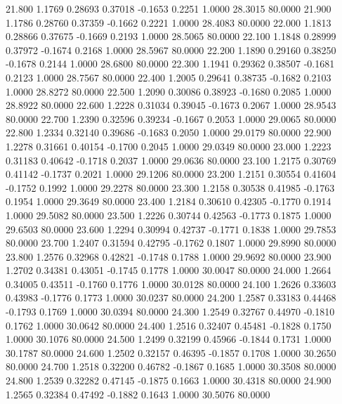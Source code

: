  21.800   1.1769   0.28693   0.37018  -0.1653   0.2251   1.0000  28.3015  80.0000
  21.900   1.1786   0.28760   0.37359  -0.1662   0.2221   1.0000  28.4083  80.0000
  22.000   1.1813   0.28866   0.37675  -0.1669   0.2193   1.0000  28.5065  80.0000
  22.100   1.1848   0.28999   0.37972  -0.1674   0.2168   1.0000  28.5967  80.0000
  22.200   1.1890   0.29160   0.38250  -0.1678   0.2144   1.0000  28.6800  80.0000
  22.300   1.1941   0.29362   0.38507  -0.1681   0.2123   1.0000  28.7567  80.0000
  22.400   1.2005   0.29641   0.38735  -0.1682   0.2103   1.0000  28.8272  80.0000
  22.500   1.2090   0.30086   0.38923  -0.1680   0.2085   1.0000  28.8922  80.0000
  22.600   1.2228   0.31034   0.39045  -0.1673   0.2067   1.0000  28.9543  80.0000
  22.700   1.2390   0.32596   0.39234  -0.1667   0.2053   1.0000  29.0065  80.0000
  22.800   1.2334   0.32140   0.39686  -0.1683   0.2050   1.0000  29.0179  80.0000
  22.900   1.2278   0.31661   0.40154  -0.1700   0.2045   1.0000  29.0349  80.0000
  23.000   1.2223   0.31183   0.40642  -0.1718   0.2037   1.0000  29.0636  80.0000
  23.100   1.2175   0.30769   0.41142  -0.1737   0.2021   1.0000  29.1206  80.0000
  23.200   1.2151   0.30554   0.41604  -0.1752   0.1992   1.0000  29.2278  80.0000
  23.300   1.2158   0.30538   0.41985  -0.1763   0.1954   1.0000  29.3649  80.0000
  23.400   1.2184   0.30610   0.42305  -0.1770   0.1914   1.0000  29.5082  80.0000
  23.500   1.2226   0.30744   0.42563  -0.1773   0.1875   1.0000  29.6503  80.0000
  23.600   1.2294   0.30994   0.42737  -0.1771   0.1838   1.0000  29.7853  80.0000
  23.700   1.2407   0.31594   0.42795  -0.1762   0.1807   1.0000  29.8990  80.0000
  23.800   1.2576   0.32968   0.42821  -0.1748   0.1788   1.0000  29.9692  80.0000
  23.900   1.2702   0.34381   0.43051  -0.1745   0.1778   1.0000  30.0047  80.0000
  24.000   1.2664   0.34005   0.43511  -0.1760   0.1776   1.0000  30.0128  80.0000
  24.100   1.2626   0.33603   0.43983  -0.1776   0.1773   1.0000  30.0237  80.0000
  24.200   1.2587   0.33183   0.44468  -0.1793   0.1769   1.0000  30.0394  80.0000
  24.300   1.2549   0.32767   0.44970  -0.1810   0.1762   1.0000  30.0642  80.0000
  24.400   1.2516   0.32407   0.45481  -0.1828   0.1750   1.0000  30.1076  80.0000
  24.500   1.2499   0.32199   0.45966  -0.1844   0.1731   1.0000  30.1787  80.0000
  24.600   1.2502   0.32157   0.46395  -0.1857   0.1708   1.0000  30.2650  80.0000
  24.700   1.2518   0.32200   0.46782  -0.1867   0.1685   1.0000  30.3508  80.0000
  24.800   1.2539   0.32282   0.47145  -0.1875   0.1663   1.0000  30.4318  80.0000
  24.900   1.2565   0.32384   0.47492  -0.1882   0.1643   1.0000  30.5076  80.0000
